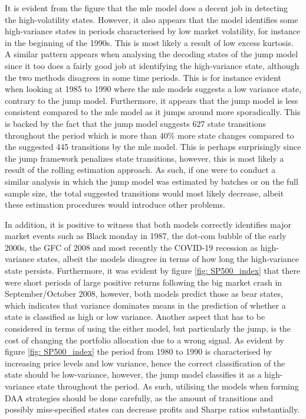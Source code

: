 It is evident from the figure that the mle model does a decent job in detecting the high-volatility states. However, it also appears that the model identifies some high-variance states in periods characterised by low market volatility, for instance in the beginning of the 1990s. This is most likely a result of low excess kurtosis. A similar pattern appears when analysing the decoding states of the jump model since it too does a fairly good job at identifying the high-variance state, although the two methods disagrees in some time periods. This is for instance evident when looking at 1985 to 1990 where the mle models suggests a low variance state, contrary to the jump model. Furthermore, it appears that the jump model is less consistent compared to the mle model as it jumps around more sporadically. This is backed by the fact that the jump model suggests 627 state transitions throughout the period which is more than 40\% more state changes compared to the suggested 445 transitions by the mle model. This is perhaps surprisingly since the jump framework penalizes state transitions, however, this is most likely a result of the rolling estimation approach. As such, if one were to conduct a similar analysis in which the jump model was estimated by batches or on the full sample size, the total suggested transitions would most likely decrease, albeit these estimation procedures would introduce other problems. 

In addition, it is positive to witness that both models correctly identifies major market events such as Black monday in 1987, the dot-com bubble of the early 2000s, the GFC of 2008 and most recently the COVID-19 recession as high-variance states, albeit the models disagree in terms of how long the high-variance state persists. Furthermore, it was evident by figure \ref{fig: SP500_index} that there were short periods of large positive returns following the big market crash in September/October 2008, however, both models predict those as bear states, which indicates that variance dominates means in the prediction of whether a state is classified as high or low variance. Another aspect that has to be considered in terms of using the either model, but particularly the jump, is the cost of changing the portfolio allocation due to a wrong signal. As evident by figure \ref{fig: SP500_index} the period from 1980 to 1990 is characterised by increasing price levels and low variance, hence the correct classification of the state should be low-variance, however, the jump model classifies it as a high-variance state throughout the period. As such, utilising the models when forming DAA strategies should be done carefully, as the amount of transitions and possibly miss-specified states can decrease profits and Sharpe ratios substantially.  

